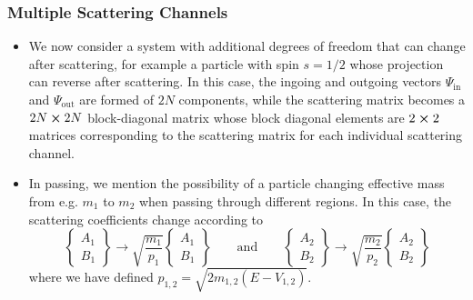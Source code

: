 \documentclass[11pt, a4paper]{article}
\begin{document}
\subsubsection{Multiple Scattering Channels}
\begin{itemize}
    \item We now consider a system with additional degrees of freedom that can change after scattering, for example a particle with spin $ s = 1/2 $ whose projection can reverse after scattering. In this case, the ingoing and outgoing vectors $ \Psi_{\text{in}} $ and $ \Psi_{\text{out}} $ are formed of $ 2N $ components, while the scattering matrix becomes a $ 2N \cross 2N $ block-diagonal matrix whose block diagonal elements are $ 2 \cross 2 $ matrices corresponding to the scattering matrix for each individual scattering channel.

    \item In passing, we mention the possibility of a particle changing effective mass from e.g. $ m_{1} $ to $ m_{2} $ when passing through different regions. In this case, the scattering coefficients change according to
    \begin{equation*}
        \begin{Bmatrix}
            A_{1}\\
            B_{1}
        \end{Bmatrix}
        \to \sqrt{\frac{m_{1}}{p_{1}}}
        \begin{Bmatrix}
            A_{1}\\
            B_{1}
        \end{Bmatrix} 
        \qquad \text{and} \qquad 
        \begin{Bmatrix}
            A_{2}\\
            B_{2}
        \end{Bmatrix}
        \to \sqrt{\frac{m_{2}}{p_{2}}}
        \begin{Bmatrix}
            A_{2}\\
            B_{2}
        \end{Bmatrix}
    \end{equation*}
    where we have defined $ p_{1,2} = \sqrt{2m_{1,2}(E - V_{1,2})} $.

\end{itemize}
\end{document}
